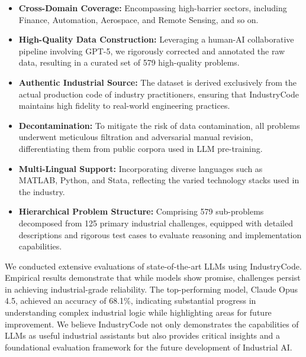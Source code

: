 \documentclass{article}
\theoremstyle{plain}
\theoremstyle{definition}
\theoremstyle{remark}
\begin{document}
\begin{itemize}
  \vspace{-0.2cm}
  \item \textbf{Cross-Domain Coverage:} Encompassing high-barrier sectors, including Finance, Automation, Aerospace, and Remote Sensing, and so on.
  \vspace{-0.2cm}
  \item \textbf{High-Quality Data Construction:} Leveraging a human-AI collaborative pipeline involving GPT-5, we rigorously corrected and annotated the raw data, resulting in a curated set of 579 high-quality problems.
  
  \vspace{-0.15cm}
  \item \textbf{Authentic Industrial Source:} The dataset is derived exclusively from the actual production code of industry practitioners, ensuring that IndustryCode maintains high fidelity to real-world engineering practices.
  \vspace{-0.2cm}
  \item \textbf{ Decontamination:} To mitigate the risk of data contamination, all problems underwent meticulous filtration and adversarial manual revision, differentiating them from public corpora used in LLM pre-training.
  \vspace{-0.2cm}
  \item \textbf{Multi-Lingual Support:} Incorporating diverse languages such as MATLAB, Python, and Stata, reflecting the varied technology stacks used in the industry.
  \vspace{-0.2cm}
  \item \textbf{Hierarchical Problem Structure:} Comprising 579 sub-problems decomposed from 125 primary industrial challenges, equipped with detailed descriptions and rigorous test cases to evaluate reasoning and implementation capabilities.

\end{itemize}

We conducted extensive evaluations of state-of-the-art LLMs using IndustryCode.
Empirical results demonstrate that while models show promise, challenges persist in achieving industrial-grade reliability.
The top-performing model, Claude Opus 4.5, achieved an accuracy of 68.1\%, indicating substantial progress in understanding complex industrial logic while highlighting areas for future improvement.
We believe IndustryCode not only demonstrates the capabilities of LLMs as useful industrial assistants but also provides critical insights and a foundational evaluation framework for the future development of Industrial AI.
\end{document}
